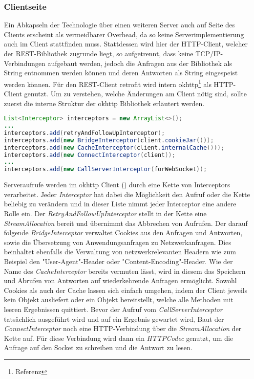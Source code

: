         \subsubsection{Clientseite}
        Ein Abkapseln der Technologie über einen weiteren Server auch auf Seite des Clients erscheint als vermeidbarer Overhead, da so keine Serverimplementierung auch im Client stattfinden muss. Stattdessen wird hier der HTTP-Client, welcher der REST-Bibliothek zugrunde liegt, so aufgetrennt, dass keine TCP/IP-Verbindungen aufgebaut werden, jedoch die Anfragen aus der Bibliothek als String entnommen werden können und  deren Antworten als String eingespeist werden können. Für den REST-Client retrofit wird intern okhttp\footnote{Referenz} als HTTP-Client genutzt. Um zu verstehen, welche Änderungen am Client nötig sind, sollte zuerst die interne Struktur der okhttp Bibliothek erläutert werden.
        \begin{lstlisting}[frame=bt, label={lst:android:okhttp}, language=Java, caption=Interner Aufbau von okhttp (Clientcode in Java)]
List<Interceptor> interceptors = new ArrayList<>();
...
interceptors.add(retryAndFollowUpInterceptor);
interceptors.add(new BridgeInterceptor(client.cookieJar()));
interceptors.add(new CacheInterceptor(client.internalCache()));
interceptors.add(new ConnectInterceptor(client));
...
interceptors.add(new CallServerInterceptor(forWebSocket));
        \end{lstlisting}
        Serveraufrufe werden im okhttp Client () \cite{okhttpRealCall} durch eine Kette von Interceptors verarbeitet. Jeder {\it Interceptor} hat dabei die Möglichkeit den Aufruf oder die Kette beliebig zu verändern und in dieser Liste nimmt jeder Interceptor eine andere Rolle ein. Der {\it RetryAndFollowUpInterceptor} stellt in der Kette eine {\it StreamAllocation} bereit und übernimmt das Abbrechen von Aufrufen. Der darauf folgende {\it BridgeInterceptor} verwaltet Cookies aus den Anfragen und Antworten, sowie die Übersetzung von Anwendungsanfragen zu Netzwerkanfragen. Dies beinhaltet ebenfalls die Verwaltung von netzwerkrelevanten Headern wie zum Beispiel den "User-Agent"-Header oder "Content-Encoding"-Header. Wie der Name des {\it CacheInterceptor} bereits vermuten lässt, wird in diesem das Speichern und Abrufen von Antworten auf wiederkehrende Anfragen ermöglicht. Sowohl Cookies als auch der Cache lassen sich einfach umgehen, indem der Client jeweils kein Objekt ausliefert oder ein Objekt bereitstellt, welche alle Methoden mit leeren Ergebnissen quittiert. Bevor der Aufruf vom {\it CallServerInterceptor} tatsächlich ausgeführt wird und auf ein Ergebnis gewartet wird, Baut der {\it ConnectInterceptor} noch eine HTTP-Verbindung über die {\it StreamAllocation} der Kette auf. Für diese Verbindung wird dann ein {\it HTTPCodec} genutzt, um die Anfrage auf den Socket zu schreiben und die Antwort zu lesen.
